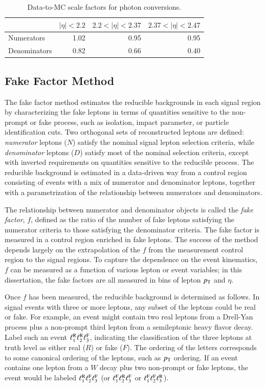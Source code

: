 \begin{table}[tbp]
  \centering
  \begin{tabular}{l r r r}
					 &$|\eta|<2.2$     &$2.2<|\eta|<2.37$     &$2.37<|\eta|<2.47$\\
	\hline
	Numerators       &1.02             &0.95                  &0.95\\
	Denominators     &0.82             &0.66                  &0.40\\
  \end{tabular}
  \caption{Data-to-MC scale factors for photon conversions.}
  \label{table:conversion-sfs}
\end{table}



\subsection{Fake Factor Method}\label{sec:fake-factor-method}
The fake factor method estimates the reducible backgrounds in each signal region by characterizing the fake leptons in terms of quantities sensitive to the non-prompt or fake process, such as isolation, impact parameter, or particle identification cuts. Two orthogonal sets of reconstructed leptons are defined: \emph{numerator} leptons ($N$) satisfy the nominal signal lepton selection criteria, while \emph{denominator} leptons ($D$) satisfy most of the nominal selection criteria, except with inverted requirements on quantities sensitive to the reducible process. The reducible background is estimated in a data-driven way from a control region consisting of events with a mix of numerator and denominator leptons, together with a parametrization of the relationship between numerators and denominators. 

The relationship between numerator and denominator objects is called the \emph{fake factor}, $f$, defined as the ratio of the number of fake leptons satisfying the numerator criteria to those satisfying the denominator criteria. The fake factor is measured in a control region enriched in fake leptons. The success of the method depends largely on the extrapolation of the $f$ from the measurement control region to the signal regions. To capture the dependence on the event kinematics, $f$ can be measured as a function of various lepton or event variables; in this dissertation, the fake factors are all measured in bins of lepton $p_{\text{T}}$ and $\eta$. 

Once $f$ has been measured, the reducible background is determined as follows. In signal events with three or more leptons, any subset of the leptons could be real or fake. For example, an event might contain two real leptons from a Drell-Yan process plus a non-prompt third lepton from a semileptonic heavy flavor decay. Label such an event $\ell_{1}^{\mathrm{R}}\ell_{2}^{\mathrm{R}}\ell_{3}^{\mathrm{F}}$, indicating the classification of the three leptons at truth level as either real ($R$) or fake ($F$). The ordering of the letters corresponds to some canonical ordering of the leptons, such as $p_{\text{T}}$ ordering. If an event contains one lepton from a $W$ decay plus two non-prompt or fake leptons, the event would be labeled $\ell_{1}^{\mathrm{R}}\ell_{2}^{\mathrm{F}}\ell_{3}^{\mathrm{F}}$ (or $\ell_{1}^{\mathrm{F}}\ell_{2}^{\mathrm{R}}\ell_{3}^{\mathrm{F}}$ or $\ell_{1}^{\mathrm{F}}\ell_{2}^{\mathrm{F}}\ell_{3}^{\mathrm{R}}$). 

